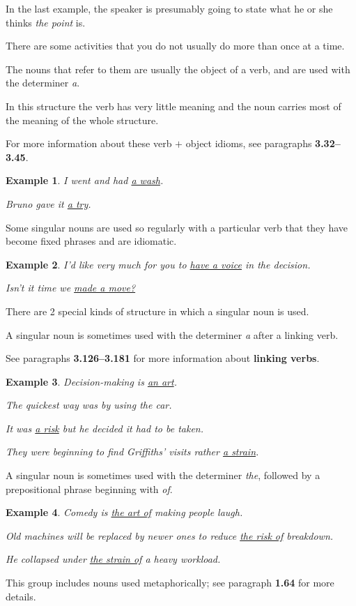 \documentclass[oneside]{book}
\numberwithin{equation}{section}
\newtheorem{example}{Example}[section]
\begin{document}
In the last example, the speaker is presumably going to state what he or she thinks \textit{the point} is.

%
\noindent{} There are some activities that you do not usually do more than once at a time.

The nouns that refer to them are usually the object of a verb, and are used with the determiner \textit{a}.

%
In this structure the verb has very little meaning and the noun carries most of the meaning of the whole structure.

For more information about these verb $+$ object idioms, see paragraphs \textbf{3.32--3.45}.
\begin{example}
    I went and had \underline{a wash}.
    
    Bruno gave it \underline{a try}.
\end{example}
Some singular nouns are used so regularly with a particular verb that they have become fixed phrases and are idiomatic.
\begin{example}
    I'd like very much for you to \underline{have a voice} in the decision.
    
    Isn't it time we \underline{made a move?}
\end{example}
%
\noindent{} There are 2 special kinds of structure in which a singular noun is used.

%
A singular noun is sometimes used with the determiner \textit{a} after a linking verb.

See paragraphs \textbf{3.126--3.181} for more information about \textbf{linking verbs}.
\begin{example}
    Decision-making is \underline{an art}.
    
    The quickest way was by using the car.
    
    It was \underline{a risk} but he decided it had to be taken.
    
    They were beginning to find Griffiths' visits rather \underline{a strain}.
\end{example}
A singular noun is sometimes used with the determiner \textit{the}, followed by a prepositional phrase beginning with \textit{of}.
\begin{example}
    Comedy is \underline{the art of} making people laugh.
    
    Old machines will be replaced by newer ones to reduce \underline{the risk of} breakdown.
    
    He collapsed under \underline{the strain of} a heavy workload.
\end{example}
This group includes nouns used metaphorically; see paragraph \textbf{1.64} for more details.
\end{document}
